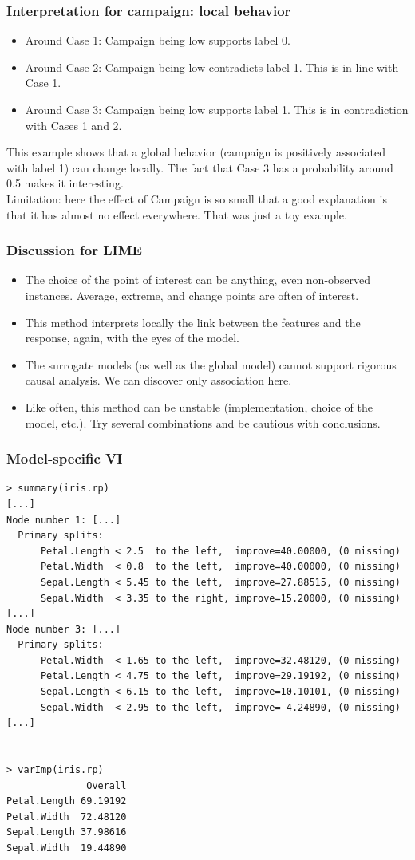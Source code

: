 \begin{frame}
\frametitle{Interpretation for campaign: local behavior}
\begin{itemize}
\item Around Case 1: Campaign being low supports label 0. 
\item Around Case 2: Campaign being low contradicts label 1. This is in line with Case 1.
\item Around Case 3: Campaign being low supports label 1. This is in contradiction with Cases 1 and 2. 
\end{itemize}
This example shows that a global behavior (campaign is positively associated with label 1) can change locally. The fact that Case 3 has a probability around 0.5 makes it interesting. \\
\vspace{0.2cm}
Limitation: here the effect of Campaign is so small that a good explanation is that it has almost no effect everywhere. That was just a toy example.
\end{frame}
\begin{frame}
\frametitle{Discussion for LIME}
\begin{itemize}
\item The choice of the point of interest can be anything, even non-observed instances. Average, extreme, and change points are often of interest.
\item This method interprets locally the link between the features and the response, again, with the eyes of the model.
\item The surrogate models (as well as the global model) cannot support rigorous causal analysis. We can discover only association here. 
\item Like often, this method can be unstable (implementation, choice of the model, etc.). Try several combinations and be cautious with conclusions.
\end{itemize}
\end{frame}


\begin{frame}[fragile]
\frametitle{Model-specific VI}
\tiny
\begin{verbatim}
> summary(iris.rp)
[...]
Node number 1: [...]
  Primary splits:
      Petal.Length < 2.5  to the left,  improve=40.00000, (0 missing)
      Petal.Width  < 0.8  to the left,  improve=40.00000, (0 missing)
      Sepal.Length < 5.45 to the left,  improve=27.88515, (0 missing)
      Sepal.Width  < 3.35 to the right, improve=15.20000, (0 missing)
[...]
Node number 3: [...]
  Primary splits:
      Petal.Width  < 1.65 to the left,  improve=32.48120, (0 missing)
      Petal.Length < 4.75 to the left,  improve=29.19192, (0 missing)
      Sepal.Length < 6.15 to the left,  improve=10.10101, (0 missing)
      Sepal.Width  < 2.95 to the left,  improve= 4.24890, (0 missing)
[...]


> varImp(iris.rp)
              Overall
Petal.Length 69.19192
Petal.Width  72.48120
Sepal.Length 37.98616
Sepal.Width  19.44890
\end{verbatim}
\end{frame}
